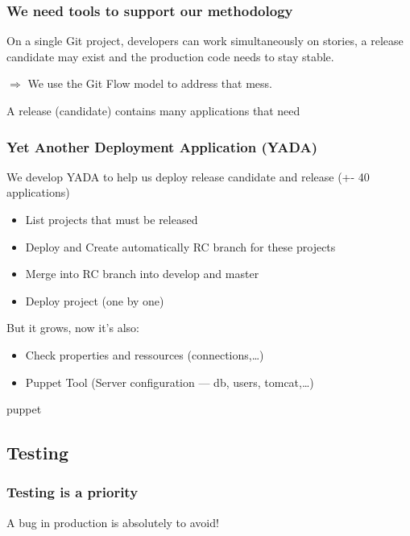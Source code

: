 \documentclass[a4paper, 11pt]{article}
\begin{document}
    \subsubsection{We need tools to support our methodology}

    On a single Git project, developers can work simultaneously on stories, a
    release candidate may exist and the production code needs to stay stable.

    $\Rightarrow$ We use the Git Flow model to address that mess.

    A release (candidate) contains many applications that need

    \subsubsection{Yet Another Deployment Application (YADA)}

    We develop YADA to help us deploy release candidate and release (+- 40 applications)

    \begin{itemize}
        \item List projects that must be released
        \item Deploy and Create automatically RC branch for these projects
        \item Merge into RC branch into develop and master
        \item Deploy project (one by one)
    \end{itemize}

    But it grows, now it's also:

    \begin{itemize}
        \item Check properties and ressources (connections,\ldots)
        \item Puppet Tool (Server configuration --- db, users, tomcat,\ldots)
    \end{itemize}

    puppet

    \subsection{Testing}

    \subsubsection{Testing is a priority}

    A bug in production is absolutely to avoid!
\end{document}
